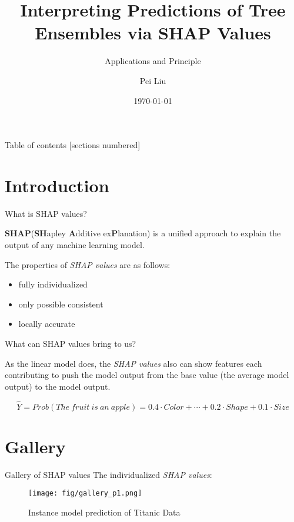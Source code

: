 \documentclass[10pt]{beamer}
\title{Interpreting Predictions of Tree Ensembles via SHAP Values}
\subtitle{Applications and Principle}
\date{\today}
\author{Pei Liu}
\institute{Department of Computer Science @UESTC}
\newcommand{\shap}{\emph{SHAP values}\xspace}
\begin{document}
\maketitle

\begin{frame}{Table of contents}
  [sections numbered]
  \tableofcontents[hideallsubsections]
\end{frame}

\section{Introduction}

\begin{frame}[fragile]{What is SHAP values?}

  \textbf{SHAP}(\textbf{SH}apley \textbf{A}dditive ex\textbf{P}lanation) is a unified approach to explain the output of any machine learning model.

  The properties of \shap are as follows:
  \begin{itemize}
    \item fully individualized
    \item only possible consistent
    \item locally accurate
  \end{itemize}

\end{frame}


\begin{frame}[fragile]{What can SHAP values bring to us?}
  
  As the linear model does, the \shap also can show features each contributing to push the model output from the base value (the average model output) to the model output.

  \begin{equation*}
    \hat{Y} = Prob(The\ fruit\ is\ an\ apple) = 0.4 \cdot Color + \cdots + 0.2 \cdot Shape + 0.1 \cdot Size
  \end{equation*}

\end{frame}

\section{Gallery}

\begin{frame}[fragile]{Gallery of SHAP values}
  The individualized \shap :
  \begin{figure}[htbp]
    \centering
    \texttt{[image: fig/gallery\_p1.png]}
    \caption{Instance model prediction of Titanic Data}
  \end{figure}
\end{frame}
\end{document}
